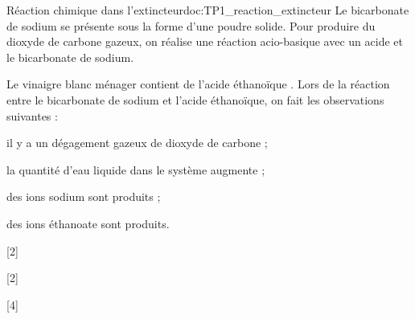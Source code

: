 \begin{doc}{Réaction chimique dans l'extincteur}{doc:TP1_reaction_extincteur}
  Le bicarbonate de sodium \bicarbonateDeSodium se présente sous la forme d'une poudre solide.
  Pour produire du dioxyde de carbone gazeux, on réalise une réaction acio-basique avec un acide et le bicarbonate de sodium.
  
  Le vinaigre blanc ménager contient de l'acide éthanoïque .
  Lors de la réaction entre le bicarbonate de sodium et l'acide éthanoïque, on fait les observations suivantes :
  \begin{listePoints}
    \item il y a un dégagement gazeux de dioxyde de carbone \dioxydeDeCarbone ;
    \item la quantité d'eau liquide dans le système augmente ;
    \item des ions sodium \ionSodium sont produits ;
    \item des ions éthanoate  sont produits.
  \end{listePoints}
\end{doc}

[2]

[2]

[4]

% 
